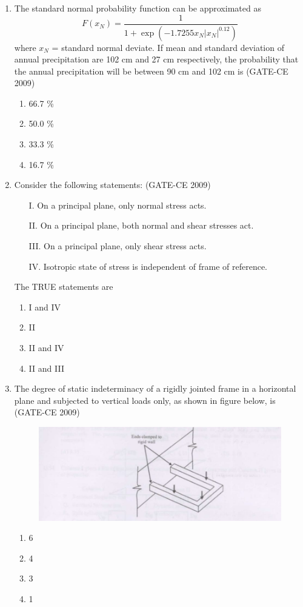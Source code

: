 \documentclass[journal,12pt,onecolumn]{article}
\theoremstyle{remark}
\begin{document}
\begin{enumerate}
    \item The standard normal probability function can be approximated as
    \[ F(x_N) = \frac{1}{1+\exp\left(-1.7255 x_N | x_N |^{0.12}\right)} \]
    where $x_N$ = standard normal deviate. If mean and standard deviation of annual precipitation are 102 cm and 27 cm respectively, the probability that the annual precipitation will be between 90 cm and 102 cm is (GATE-CE 2009)
    \begin{enumerate}
        \item 66.7 \% 
        \item 50.0 \% 
        \item 33.3 \% 
        \item 16.7 \%
    \end{enumerate}
    
    \item Consider the following statements: (GATE-CE 2009)
    \begin{itemize}
        \item[I.] On a principal plane, only normal stress acts.
        \item[II.] On a principal plane, both normal and shear stresses act.
        \item[III.] On a principal plane, only shear stress acts.
        \item[IV.] Isotropic state of stress is independent of frame of reference.
    \end{itemize}
    The TRUE statements are
    \begin{enumerate}
        \item I and IV 
        \item II 
        \item II and IV 
        \item II and III
    \end{enumerate}
    
    \item The degree of static indeterminacy of a rigidly jointed frame in a horizontal plane and subjected to vertical loads only, as shown in figure below, is (GATE-CE 2009)
    \begin{figure}[H]
    \centering
    \includegraphics[width=0.7\columnwidth]{figs/image.jpg}
    \label{fig:placeholder}
    \end{figure}
    \begin{enumerate}
        \item 6 
        \item 4 
        \item 3 
        \item 1
    \end{enumerate}
    

\end{enumerate}
\end{document}
